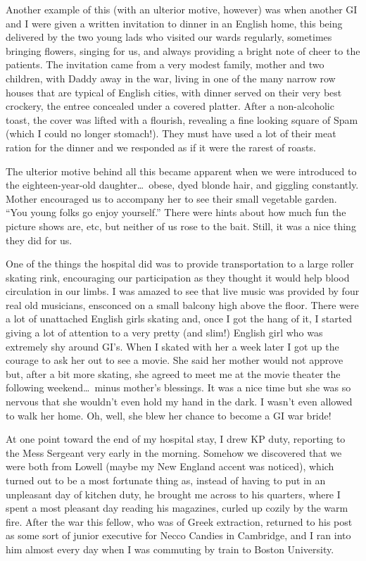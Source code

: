 \documentclass[../m3y]{subfiles}
\begin{document}
Another example of this (with an ulterior motive, however) was when another GI and I were given a written invitation to dinner in an English home, this being delivered by the two young lads who visited our wards regularly, sometimes bringing flowers, singing for us, and always providing a bright note of cheer to the patients. The invitation came from a very modest family, mother and two children, with Daddy away in the war, living in one of the many narrow row houses that are typical of English cities, with dinner served on their very best crockery, the entree concealed under a covered platter. After a non-alcoholic toast, the cover was lifted with a flourish, revealing a fine looking square of Spam (which I could no longer stomach!). They must have used a lot of their meat ration for the dinner and we responded as if it were the rarest of roasts.

The ulterior motive behind all this became apparent when we were introduced to the eighteen-year-old daughter\ldots\ obese, dyed blonde hair, and giggling constantly. Mother encouraged us to accompany her to see their small vegetable garden. ``You young folks go enjoy yourself.'' There were hints about how much fun the picture shows are, etc, but neither of us rose to the bait. Still, it was a nice thing they did for us.

One of the things the hospital did was to provide transportation to a large roller skating rink, encouraging our participation as they thought it would help blood circulation in our limbs. I was amazed to see that live music was provided by four real old musicians, ensconced on a small balcony high above the floor. There were a lot of unattached English girls skating and, once I got the hang of it, I started giving a lot of attention to a very pretty (and slim!) English girl who was extremely shy around GI's. When I skated with her a week later I got up the courage to ask her out to see a movie. She said her mother would not approve but, after a bit more skating, she agreed to meet me at the movie theater the following weekend\ldots\ minus mother's blessings. It was a nice time but she was so nervous that she wouldn't even hold my hand in the dark. I wasn't even allowed to walk her home. Oh, well, she blew her chance to become a GI war bride!

At one point toward the end of my hospital stay, I drew KP duty, reporting to the Mess Sergeant very early in the morning. Somehow we discovered that we were both from Lowell (maybe my New England accent was noticed), which turned out to be a most fortunate thing as, instead of having to put in an unpleasant day of kitchen duty, he brought me across to his quarters, where I spent a most pleasant day reading his magazines, curled up cozily by the warm fire. After the war this fellow, who was of Greek extraction, returned to his post as some sort of junior executive for Necco Candies in Cambridge, and I ran into him almost every day when I was commuting by train to Boston University.
\end{document}
